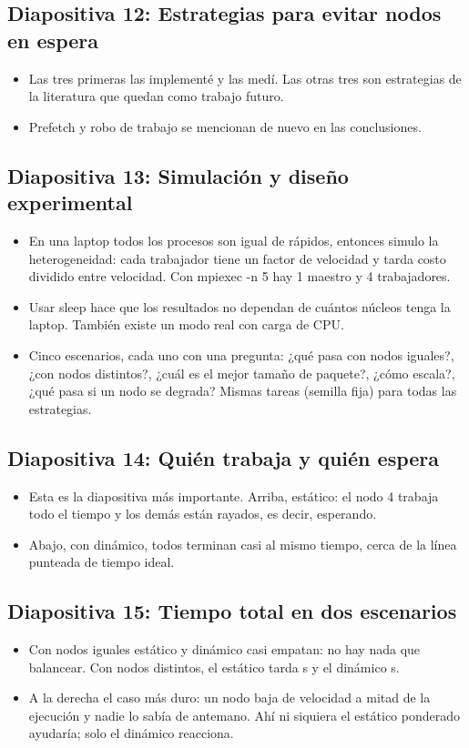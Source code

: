 \documentclass[11pt,a4paper]{article}
\begin{document}
\subsection*{Diapositiva 12: Estrategias para evitar nodos en espera}
\begin{itemize}
  \item Las tres primeras las implementé y las medí. Las otras tres son estrategias de la literatura que quedan como trabajo futuro.
  \item Prefetch y robo de trabajo se mencionan de nuevo en las conclusiones.
\end{itemize}

\subsection*{Diapositiva 13: Simulación y diseño experimental}
\begin{itemize}
  \item En una laptop todos los procesos son igual de rápidos, entonces simulo la heterogeneidad: cada trabajador tiene un factor de velocidad y tarda costo dividido entre velocidad. Con mpiexec -n 5 hay 1 maestro y 4 trabajadores.
  \item Usar sleep hace que los resultados no dependan de cuántos núcleos tenga la laptop. También existe un modo real con carga de CPU.
  \item Cinco escenarios, cada uno con una pregunta: ¿qué pasa con nodos iguales?, ¿con nodos distintos?, ¿cuál es el mejor tamaño de paquete?, ¿cómo escala?, ¿qué pasa si un nodo se degrada? Mismas tareas (semilla fija) para todas las estrategias.
\end{itemize}

\subsection*{Diapositiva 14: Quién trabaja y quién espera}
\begin{itemize}
  \item Esta es la diapositiva más importante. Arriba, estático: el nodo 4 trabaja todo el tiempo y los demás están rayados, es decir, esperando.
  \item Abajo, con dinámico, todos terminan casi al mismo tiempo, cerca de la línea punteada de tiempo ideal.
\end{itemize}

\subsection*{Diapositiva 15: Tiempo total en dos escenarios}
\begin{itemize}
  \item Con nodos iguales estático y dinámico casi empatan: no hay nada que balancear. Con nodos distintos, el estático tarda \tEstHet{} s y el dinámico \tDinHet{} s.
  \item A la derecha el caso más duro: un nodo baja de velocidad a mitad de la ejecución y nadie lo sabía de antemano. Ahí ni siquiera el estático ponderado ayudaría; solo el dinámico reacciona.
\end{itemize}
\end{document}
